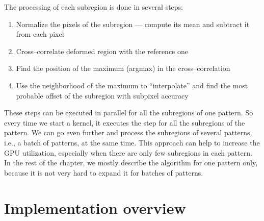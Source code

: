 The processing of each subregion is done in several steps:
\begin{enumerate}
	\item Normalize the pixels of the subregion --- compute its mean and subtract it from each pixel
	\item Cross--correlate deformed region with the reference one
	\item Find the position of the maximum (argmax) in the cross--correlation
	\item Use the neighborhood of the maximum to ``interpolate'' and find the most probable offset of the subregion with subpixel accuracy
\end{enumerate}

These steps can be executed in parallel for all the subregions of one pattern. So every time we start a kernel, it executes the step for all the subregions of the pattern. We can go even further and process the subregions of several patterns, i.e., a batch of patterns, at the same time. This approach can help to increase the GPU utilization, especially when there are only few subregions in each pattern. In the rest of the chapter, we mostly describe the algorithm for one pattern only, because it is not very hard to expand it for batches of patterns.


\section{Implementation overview}

